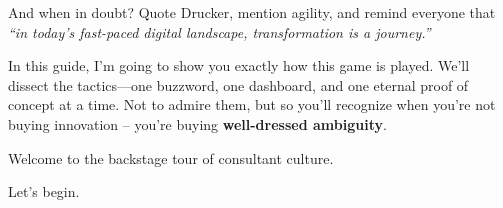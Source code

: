 And when in doubt? Quote Drucker, mention agility, and remind everyone that \textit{``in today’s fast-paced digital landscape, transformation is a journey.''}

\bigskip

In this guide, I’m going to show you exactly how this game is played. We’ll dissect the tactics—one buzzword, one dashboard, and one eternal proof of concept at a time. Not to admire them, but so you’ll recognize when you're not buying innovation -- you’re buying \textbf{well-dressed ambiguity}.

\medskip

Welcome to the backstage tour of consultant culture.

Let’s begin.
